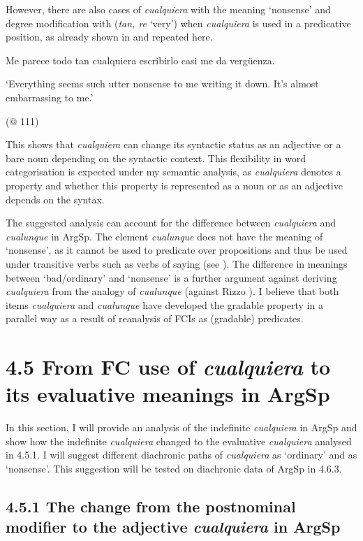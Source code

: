 However, there are also cases of \textit{cualquiera} with the meaning ‘nonsense’ and degree modification with (\textit{tan, re} ‘very’) when \textit{cualquiera} is used in a predicative position, as already shown in  and repeated here.

    Me parece todo tan cualquiera escribirlo casi me da vergüenza.

‘Everything seems such utter nonsense to me writing it down. It’s almost embarrassing to me.’

(@ 111)

This shows that \textit{cualquiera} can change its syntactic status as an adjective or a bare noun depending on the syntactic context. This flexibility in word categorisation is expected under my semantic analysis, as \textit{cualquiera} denotes a property and whether this property is represented as a noun or as an adjective depends on the syntax.

  The suggested analysis can account for the difference between \textit{cualquiera} and \textit{cualunque} in ArgSp. The element \textit{cualunque} does not have the meaning of ‘nonsense’, as it cannot be used to predicate over propositions and thus be used under transitive verbs such as verbs of saying (see ). The difference in meanings between ‘bad/ordinary’ and ‘nonsense’ is a further argument against deriving \textit{cualquiera} from the analogy of \textit{cualunque} (against Rizzo \citealt{Salierno2013}). I believe that both items \textit{cualquiera} and \textit{cualunque} have developed the gradable property in a parallel way as a result of reanalysis of FCIs as (gradable) predicates. 

\section{\textbf{4.5 }\textbf{From }\textbf{FC} \textbf{use} \textbf{of} \textbf{\textit{cualquiera}} \textbf{to} \textbf{its} \textbf{evaluative} \textbf{meanings} \textbf{in} \textbf{Arg}\textbf{Sp}}

In this section, I will provide an analysis of the indefinite \textit{cualquiera} in ArgSp and show how the indefinite \textit{cualquiera} changed to the evaluative \textit{cualquiera} analysed in 4.5.1. I will suggest different diachronic paths of \textit{cualquiera} as ‘ordinary’ and as ‘nonsense’. This suggestion will be tested on diachronic data of ArgSp in 4.6.3.

\subsection{\textbf{4.5.1} \textbf{The} \textbf{change} \textbf{from} \textbf{the} \textbf{postnominal} \textbf{modifier} \textbf{to} \textbf{the} \textbf{adjective} \textbf{\textit{cualquiera}} \textbf{in} \textbf{ArgSp}}


